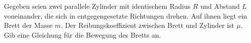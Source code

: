 \begin{Exercise}[label = Brett auf Rollen, origin = Vorbereitungsaufgabe für die
4. Runde zur 47. IPhO 2016, difficulty = 3, title = Brett auf Rollen]Gegeben seien zwei parallele Zylinder mit identischem Radius $R$ und Abstand $L$ voneinander, die sich in entgegengesetzte Richtungen drehen. Auf ihnen liegt ein Brett der Masse $m$. Der Reibungskoeffizient zwischen Brett und Zylinder ist $\mu$.\\
Gib eine Gleichung für die Bewegung des Bretts an.  
\end{Exercise}